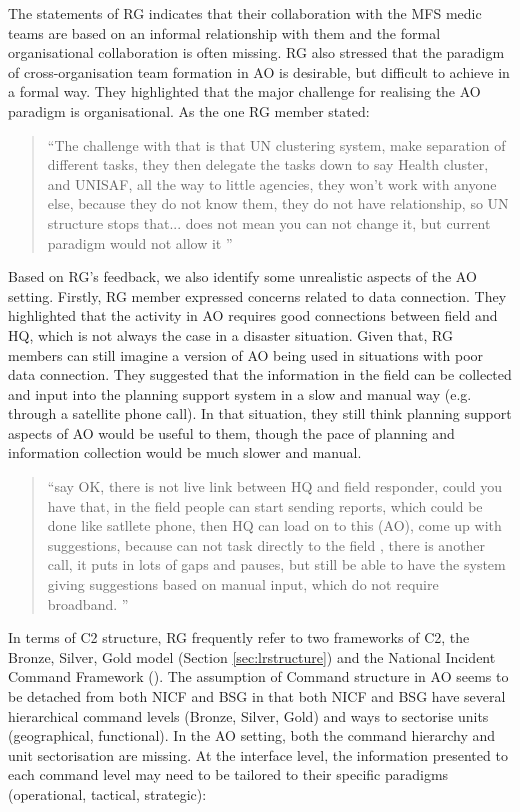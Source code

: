 The statements of \ac{RG} indicates that their collaboration with the MFS medic teams are based on an informal  relationship with them and the formal organisational collaboration is often missing. \ac{RG} also stressed that the paradigm of cross-organisation team formation in \ac{AO} is desirable, but difficult to achieve in a formal way. They highlighted that the major challenge for realising the \ac{AO} paradigm is organisational. As the one \ac{RG} member stated:\\

\begin{quotation}
``The challenge with that is that UN clustering system, make separation of different tasks, they then delegate the tasks down to say Health cluster, and UNISAF, all the way to little agencies, they won't work with anyone else, because they do not know them, they do not have relationship, so UN structure stops that... does not mean you can not change it, but current paradigm would not allow it ''
\end{quotation}

Based on \ac{RG}'s feedback, we also identify some unrealistic aspects of the \ac{AO} setting. Firstly, \ac{RG} member expressed concerns related to data connection. They highlighted that the activity in \ac{AO} requires good connections between field and HQ, which is not always the case in a disaster situation. Given that, \ac{RG} members can still imagine a version of \ac{AO} being used in situations with poor data connection. They suggested that the information in the field can be collected and input into the planning support system in a slow and manual way (e.g. through a satellite phone call). In that situation, they still think planning support aspects of \ac{AO} would be useful to them, though the pace of planning and information collection would be much slower and manual. \\
\begin{quotation}
``say  OK, there is not live link between HQ and field responder, could you have that, in the field people can start sending reports, which could be done like satllete phone, then HQ can load on to this (AO), come up with suggestions, because can not task directly to the field , there is another call,  it puts in lots of gaps and pauses, but still be able to have the system giving suggestions based on manual input, which do not require broadband. ''
\end{quotation}


In terms of \acf{C2} structure, RG frequently refer to two frameworks of \ac{C2},  the Bronze, Silver, Gold model (Section \ref{sec:lrstructure}) and the National Incident Command Framework (\citep{Command2008}). The assumption of Command structure in \ac{AO} seems to be detached from both NICF and \ac{BSG} in that both NICF and \ac{BSG} have several hierarchical command levels (Bronze, Silver, Gold) and ways to sectorise units (geographical, functional).  In the \ac{AO} setting, both the command hierarchy and unit sectorisation are missing. At the interface level, the information presented to each command level may need to be tailored to their specific paradigms (operational, tactical, strategic):

